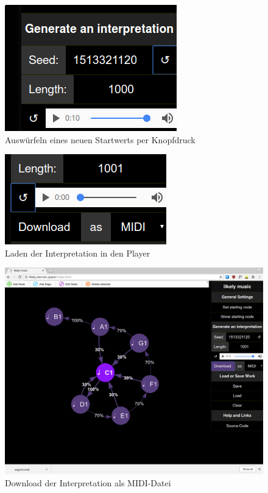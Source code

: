 \documentclass[a4paper,twocolumn]{article}
\begin{document}
\begin{figure}[H]
  \begin{center}
    \includegraphics[width=.5\textwidth]{screenshots/new-seed.png}
  \end{center}
  \caption{Auswürfeln eines neuen Startwerts per Knopfdruck}
\end{figure}

\begin{figure}[H]
  \begin{center}
  \includegraphics[width=.5\textwidth]{screenshots/reload-player.png}
  \end{center}
  \caption{Laden der Interpretation in den Player}
\end{figure}

\begin{figure}[H]
  \begin{center}
  \includegraphics[width=.8\textwidth]{screenshots/download-midi.png}
  \end{center}
  \caption{Download der Interpretation als MIDI-Datei}
\end{figure}
\end{document}
